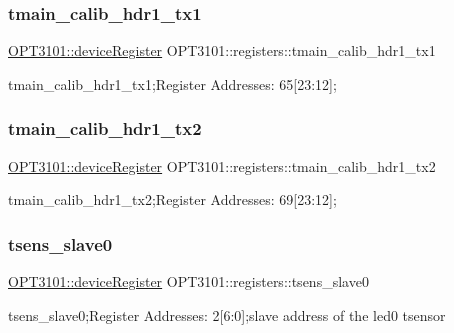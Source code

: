 \subsubsection{\texorpdfstring{tmain\+\_\+calib\+\_\+hdr1\+\_\+tx1}{tmain\_calib\_hdr1\_tx1}}
{\footnotesize\ttfamily \mbox{\hyperlink{class_o_p_t3101_1_1device_register}{O\+P\+T3101\+::device\+Register}} O\+P\+T3101\+::registers\+::tmain\+\_\+calib\+\_\+hdr1\+\_\+tx1}



tmain\+\_\+calib\+\_\+hdr1\+\_\+tx1;Register Addresses\+: 65\mbox{[}23\+:12\mbox{]}; 

\mbox{\label{class_o_p_t3101_1_1registers_a755672a04b425f526e780aca79a01183}} 
\subsubsection{\texorpdfstring{tmain\+\_\+calib\+\_\+hdr1\+\_\+tx2}{tmain\_calib\_hdr1\_tx2}}
{\footnotesize\ttfamily \mbox{\hyperlink{class_o_p_t3101_1_1device_register}{O\+P\+T3101\+::device\+Register}} O\+P\+T3101\+::registers\+::tmain\+\_\+calib\+\_\+hdr1\+\_\+tx2}



tmain\+\_\+calib\+\_\+hdr1\+\_\+tx2;Register Addresses\+: 69\mbox{[}23\+:12\mbox{]}; 

\mbox{\label{class_o_p_t3101_1_1registers_a514790a474a760e4f219616fb9e9d31e}} 
\subsubsection{\texorpdfstring{tsens\+\_\+slave0}{tsens\_slave0}}
{\footnotesize\ttfamily \mbox{\hyperlink{class_o_p_t3101_1_1device_register}{O\+P\+T3101\+::device\+Register}} O\+P\+T3101\+::registers\+::tsens\+\_\+slave0}



tsens\+\_\+slave0;Register Addresses\+: 2\mbox{[}6\+:0\mbox{]};slave address of the led0 tsensor 

